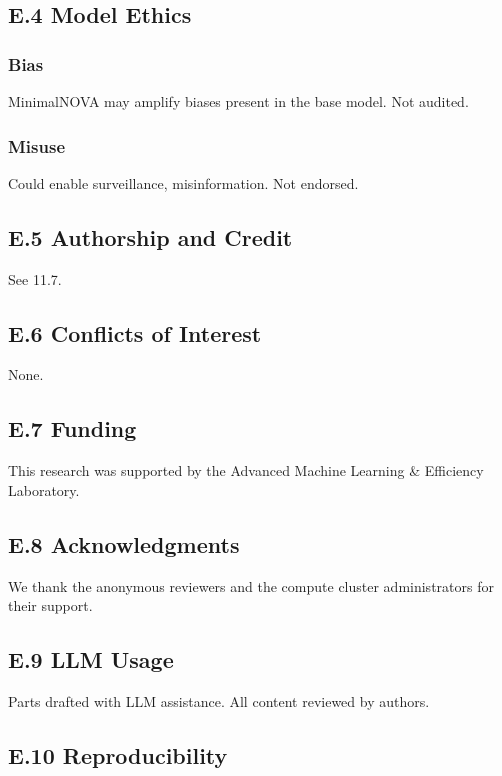 \subsection{E.4 Model Ethics}

\subsubsection{Bias}

MinimalNOVA may amplify biases present in the base model. Not audited.

\subsubsection{Misuse}

Could enable surveillance, misinformation. Not endorsed.

\subsection{E.5 Authorship and Credit}

See  11.7.

\subsection{E.6 Conflicts of Interest}

None.

\subsection{E.7 Funding}

This research was supported by the Advanced Machine Learning \& Efficiency Laboratory.

\subsection{E.8 Acknowledgments}

We thank the anonymous reviewers and the compute cluster administrators for their support.

\subsection{E.9 LLM Usage}

Parts drafted with LLM assistance. All content reviewed by authors.

\subsection{E.10 Reproducibility}

